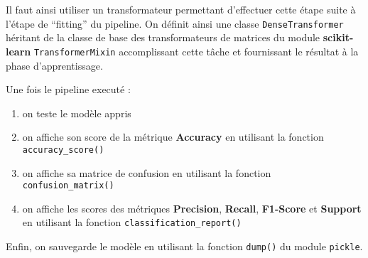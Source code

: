 \documentclass[11pt]{article}
\begin{document}
Il faut ainsi utiliser un transformateur permettant d'effectuer cette
étape suite à l'étape de ``fitting'' du pipeline. On définit ainsi une
classe \texttt{DenseTransformer} héritant de la classe de base des
transformateurs de matrices du module \textbf{scikit-learn}
\texttt{TransformerMixin} accomplissant cette tâche et fournissant le
résultat à la phase d'apprentissage.

Une fois le pipeline executé :
\begin{enumerate}
  \item on teste le modèle appris
  \item on affiche son score de la métrique \textbf{Accuracy} en utilisant la fonction \texttt{accuracy\_score()}
  \item on affiche sa matrice de confusion en utilisant la fonction \texttt{confusion\_matrix()}
  \item on affiche les scores des métriques \textbf{Precision}, \textbf{Recall}, \textbf{F1-Score} et \textbf{Support} en utilisant la fonction \texttt{classification\_report()}
\end{enumerate}

Enfin, on sauvegarde le modèle en utilisant la fonction \texttt{dump()}
du module \texttt{pickle}.


\end{document}
